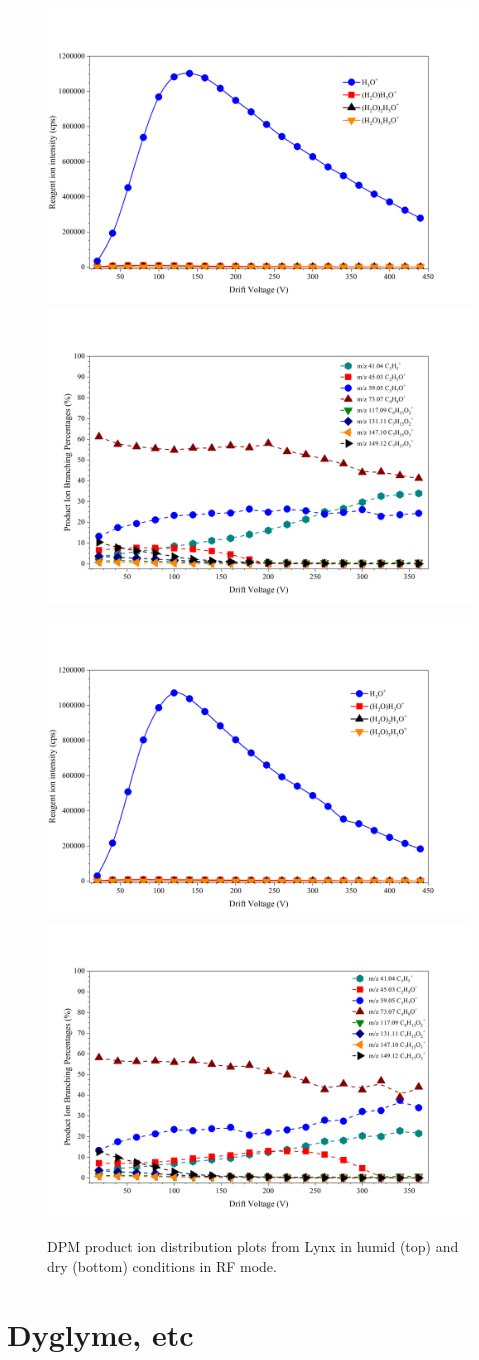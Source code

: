 \begin{figure}%
\centering
\includegraphics[width=0.48\linewidth]{pics/DPM_clusters_humid_RF.png}
\includegraphics[width=0.48\linewidth]{pics/DPM_humid_RF.png}

\includegraphics[width=0.48\linewidth]{pics/DPM_clusters_dry_RF.png}
\includegraphics[width=0.48\linewidth]{pics/DPM_dry_RF.png}
\caption{DPM product ion distribution plots from Lynx in humid (top) and  dry (bottom) conditions in RF mode.}
\label{fig:dpm2}
\end{figure}






\section{Dyglyme, etc}

